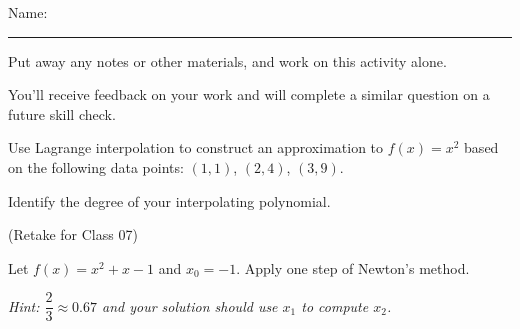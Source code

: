 \documentclass[12pt,letterpaper,noanswers]{exam}
\begin{document}
 \pdfpageheight 11in 
  \pdfpagewidth 8.5in

\noindent Name: \rule{2.5in}{0.5pt}

\noindent Put away any notes or other materials, and work on this activity alone.

\noindent You'll receive feedback on your work and will complete a similar question on a future skill check.


\begin{questions}
\item Use Lagrange interpolation to construct an approximation to $f(x) = x^2$ based on the following data points: $(1,1)$, $(2,4)$, $(3,9)$.

Identify the degree of your interpolating polynomial.

\vspace{6cm}

\item (Retake for Class 07)

Let $f(x) = x^2 + x - 1$ and $x_0 = -1$.  Apply one step of Newton's method.

\emph{Hint: $\dfrac{2}{3}\approx0.67$ and your solution should use $x_1$ to compute $x_2$.}

\end{questions}
\end{document}
